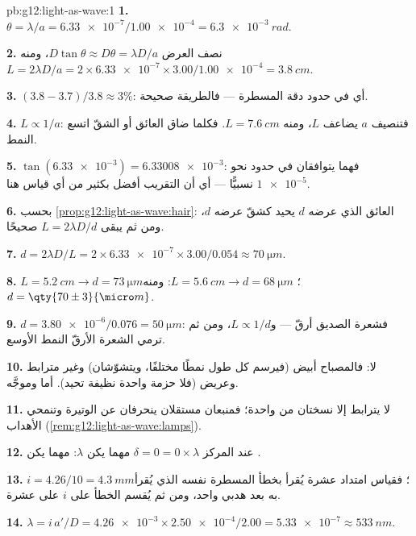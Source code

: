 \begin{solution}{pb:g12:light-as-wave:1}
\textbf{1.} $\theta = \lambda/a = \num{6.33e-7}/\num{1.00e-4} =
\qty{6.3e-3}{rad}$.

\textbf{2.} نصف العرض $D\tan\theta \approx D\theta = \lambda D/a$،
ومنه $L = 2\lambda D/a = 2 \times \num{6.33e-7} \times
3.00/\num{1.00e-4} = \qty{3.8}{cm}$.

\textbf{3.} $(3.8 - 3.7)/3.8 \approx 3\%$: أي في حدود دقة
المسطرة --- فالطريقة صحيحة.

\textbf{4.} $L \propto 1/a$: فتنصيف $a$ يضاعف $L$، ومنه
$L = \qty{7.6}{cm}$. فكلما ضاق العائق أو الشقّ اتسع النمط.

\textbf{5.} $\tan(\num{6.33e-3}) = \num{6.33008e-3}$: فهما يتوافقان في حدود
نحو $\num{1e-5}$ نسبيًّا --- أي أن التقريب أفضل بكثير من
أي قياس هنا.

\textbf{6.} بحسب \cref{prop:g12:light-as-wave:hair}: العائق الذي عرضه
$d$ يحيد كشقّ عرضه $d$، ومن ثم يبقى $L = 2\lambda D/d$
صحيحًا.

\textbf{7.} $d = 2\lambda D/L = 2 \times \num{6.33e-7} \times
3.00/0.054 \approx \qty{70}{\micro m}$.

\textbf{8.} $L = \qty{5.2}{cm} \to d = \qty{73}{\micro m}$؛
$L = \qty{5.6}{cm} \to d = \qty{68}{\micro m}$: ومنه
$d = \qty{70 \pm 3}{\micro m}$.

\textbf{9.} $d = \num{3.80e-6}/0.076 = \qty{50}{\micro m}$: فشعرة
الصديق أرقّ --- و$L \propto 1/d$، ومن ثم ترمي الشعرة الأرقّ
النمط الأوسع.

\textbf{10.} لا: فالمصباح أبيض (فيرسم كل طول  نمطًا مختلفًا،
ويتشوّشان) وغير مترابط وعريض (فلا حزمة واحدة نظيفة
تحيد). أما   وموجَّه.

\textbf{11.} لا يترابط إلا نسختان من  واحدة؛ فمنبعان مستقلان
ينحرفان عن الوتيرة وتنمحي الأهداب
(\cref{rem:g12:light-as-wave:lamps}).

\textbf{12.} عند المركز $\delta = 0 = 0 \times \lambda$ مهما يكن
$\lambda$:  مهما يكن .

\textbf{13.} $i = 4.26/10 = \qty{4.3}{mm}$؛ فقياس امتداد عشرة يُقرأ
بخطأ المسطرة نفسه الذي يُقرأ به بعد هدبي واحد، ومن ثم يُقسم الخطأ على $i$
على عشرة.

\textbf{14.} $\lambda = i\,a'/D = \num{4.26e-3} \times
\num{2.50e-4}/2.00 = \num{5.33e-7} \approx \qty{533}{nm}$.


\end{solution}
